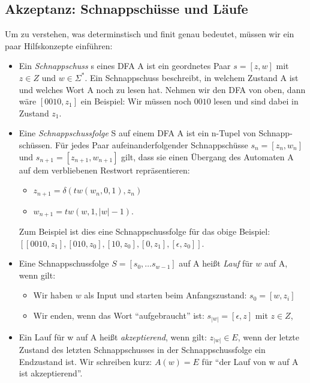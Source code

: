 \subsection{Akzeptanz: Schnappschüsse und Läufe}
Um zu verstehen, was determinstisch und finit genau bedeutet,
müssen wir ein paar Hilfskonzepte einführen:
\begin{itemize}
    \item Ein \emph{Schnappschuss} s eines DFA A ist ein geordnetes Paar $s = [z, w]$
        mit $z \in Z$ und $w \in \Sigma^*$.
        Ein Schnappschuss beschreibt,
        in welchem Zustand A ist und welches Wort A noch zu lesen hat.
        Nehmen wir den DFA von oben, dann wäre $[0010,z_1]$ ein Beispiel:
        Wir müssen noch $0010$ lesen und sind dabei in Zustand $z_1$.
    \item Eine \emph{Schnappschussfolge} S auf einem DFA A
        ist ein n-Tupel von Schnapp-schüssen. 
        Für jedes Paar aufeinanderfolgender Schnappschüsse $s_n = [z_n, w_n]$
        und $s_{n+1} = [z_{n+1}, w_{n+1}]$ gilt,
        dass sie einen Übergang des Automaten A auf dem verbliebenen Restwort repräsentieren:
        \begin{itemize}
            \item $z_{n+1} = \delta(tw(w_{n},0,1), z_n)$
            \item $w_{n+1} = tw(w,1,|w|-1)$.
        \end{itemize}
        Zum Beispiel ist dies eine Schnappschussfolge für das obige Beispiel:\linebreak
        $[[0010,z_1],[010, z_0],[10, z_0],[0,z_1],[\epsilon,z_0]]$.
    \item Eine Schnappschussfolge $S = [s_0, \ldots s_{w-1}]$ auf A
        heißt \emph{Lauf} für $w$ auf A, wenn gilt:
        \begin{itemize}
            \item Wir haben $w$ als Input und starten beim Anfangszustand:
                $s_0 = [w,z_i]$ 
            \item Wir enden, wenn das Wort ``aufgebraucht'' ist:
                $s_{|w|} = [\epsilon, z]$ mit $z \in Z$,

        \end{itemize}
    \item Ein Lauf für w auf A heißt \emph{akzeptierend}, wenn gilt:
        $z_{|w|} \in E$,
        wenn der letzte Zustand des letzten Schnappschusses in der Schnappschussfolge
        ein Endzustand ist.
        Wir schreiben kurz: $A(w) = E$
        für ``der Lauf von w auf A ist akzeptierend''. 


\end{itemize}

